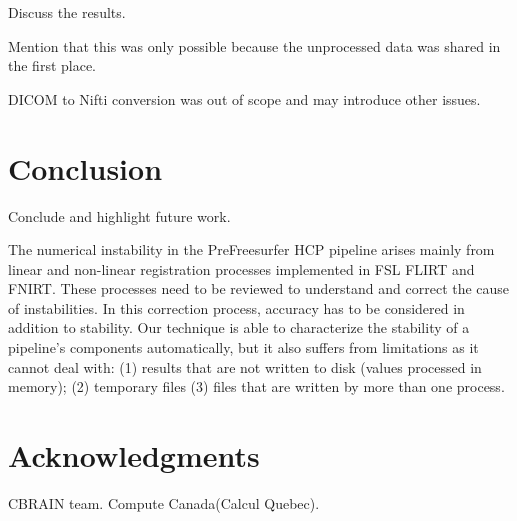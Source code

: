 \documentclass{article}
\begin{document}
Discuss the results.

Mention that this was only possible because the unprocessed data was shared in the first place.

DICOM to Nifti conversion was out of scope and may introduce other issues.

\section{Conclusion}

Conclude and highlight future work.

The numerical instability in the PreFreesurfer HCP pipeline arises mainly from linear and non-linear registration processes 
implemented in FSL FLIRT and FNIRT. These processes need to be reviewed to understand and correct the cause of instabilities. 
In this correction process, accuracy has to be considered in addition to stability. Our technique is able to 
characterize the stability of a pipeline’s components automatically, but it also suffers from limitations as it cannot deal with: 
(1) results that are not written to disk (values processed in memory); (2) temporary files (3) files that are written by more than one process.


\section{Acknowledgments}

CBRAIN team. Compute Canada(Calcul Quebec).



\end{document}
